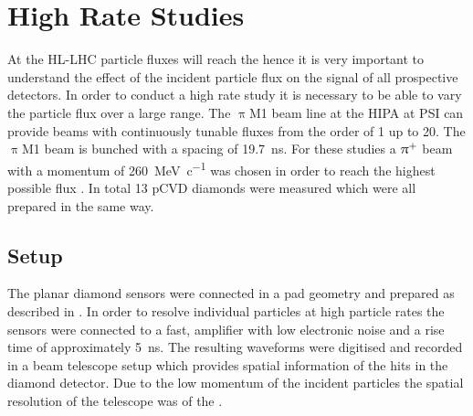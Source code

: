 \section{High Rate Studies}
At the \ac{HL-LHC} particle fluxes will reach the  hence it is very important to understand the effect of the incident particle flux on the signal of all prospective detectors. In order to conduct a high rate study it is necessary to be able to vary the particle flux over a large range. The $\uppi$M1 beam line at the \ac{HIPA} at \ac{PSI} \cite{hipa} can provide beams with continuously tunable fluxes from the order of \SI{1}{\khzcm} up to \SI{20}{\mhzcm}. The $\uppi$M1 beam is bunched with a spacing of \SI{19.7}{\nano\second}. For these studies a $\uppi^{\text{+}}$ beam with a momentum of \SI{260}{\mega\electronvolt\per c}  was chosen in order to reach the highest possible flux \cite{pim1}. In total 13 \ac{pCVD} diamonds were measured which were all prepared in the same way.\par
\subsection{Setup}
The planar diamond sensors were connected in a pad geometry and prepared as described in \cite{felix}. 
In order to resolve individual particles at high particle rates the sensors were connected to a fast, amplifier with low electronic noise and a rise time of approximately \SI{5}{\nano\second}. The resulting waveforms were digitised and recorded in a beam telescope setup which provides spatial information of the hits in the diamond detector. Due to the low momentum of the incident particles the spatial resolution of the telescope was of the .\par
